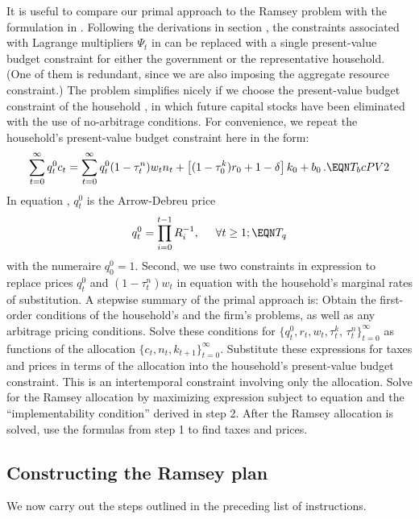 It is useful to compare our primal approach to the Ramsey problem
with the formulation in .
Following the derivations in section ,
the constraints associated with Lagrange multipliers $\Psi_t$ in 
can be replaced with a
single present-value budget constraint
for either the government or the representative household. (One
of them is redundant, since we are also imposing the aggregate resource
constraint.) The problem simplifies nicely if
we choose the present-value budget constraint of the household
, in which future capital stocks have been eliminated with
the use of no-arbitrage conditions. For convenience, we repeat the
household's present-value budget constraint  here in the form:
$$
\sum_{t=0}^\infty q^0_t c_t =
\sum_{t=0}^\infty q^0_t (1-\tau^n_t) w_t n_t
   + \left[(1-\tau^k_{0}) r_{0} + 1-\delta \right] k_0 + b_0\,.
                                                              \EQN T_bcPV2
$$
In  equation , $q^0_t$ is the Arrow-Debreu price
$$
q^0_t = \prod_{i=0}^{t-1} R_i^{-1}, \hskip.5cm \forall t\geq1;    \EQN T_q
$$
with the numeraire $q^0_0=1$. Second, we use two
constraints in expression  to replace prices
$q^0_t$ and $(1-\tau^n_t) w_t$ in equation  with the household's
marginal rates of substitution.
\vfil\break
\noindent A stepwise summary of the primal approach is:
\medskip
{} Obtain the first-order conditions of the household's
and the firm's problems, as well as any arbitrage pricing conditions.
Solve these conditions for
$\{q^0_t, r_t, w_t, \tau^k_t$,
$\tau^n_t\}_{t=0}^\infty$
as functions
of the allocation $\{c_t, n_t, k_{t+1}\}_{t=0}^\infty$.
\medskip
{}  Substitute these expressions for taxes  and
prices in terms of the allocation into the household's
present-value budget constraint.   This is an intertemporal constraint
involving only the allocation.
\medskip
{}  Solve for the Ramsey allocation by maximizing
expression  subject to  equation  and the
``implementability condition'' derived in step 2.
\medskip
{}  After the Ramsey  allocation is solved,
use the formulas from step 1 to find taxes and
prices.

\subsection{Constructing the Ramsey plan}
We now carry out the steps outlined in the preceding list of
instructions.

